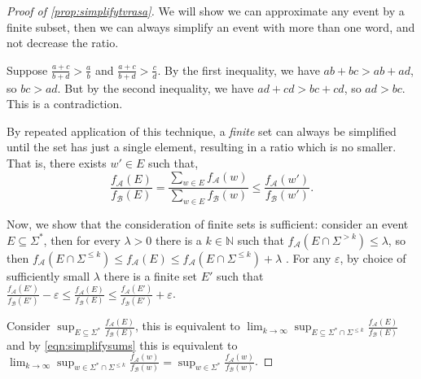 \documentclass[10pt,a4paper]{amsart}
\numberwithin{equation}{section}
\theoremstyle{plain}
\theoremstyle{definition}
\theoremstyle{remark}
\begin{document}
\begin{proof}[Proof of \cref{prop:simplifytvrasa}]
We will show we can approximate any event by a finite subset, then we can always simplify an event with more than one word, and not decrease the ratio.

Suppose $\frac{a+c}{b+d} > \frac{a}{b}$ and $\frac{a+c}{b+d} > \frac{c}{d}$.
By the first inequality, we have $ab + bc > ab + ad$, so $bc > ad$. But by the second inequality, we have $ad+cd > bc +cd$, so $ad > bc$. This is a contradiction.

By repeated application of this technique, a \emph{finite} set can always be simplified until the set has just a single element, resulting in a ratio which is no smaller.  That is, there exists $w'\in E$ such that,
\begin{equation}\label{eqn:simplifysums} \frac{f_{\mathcal A}(E) }{ f_{\mathcal B}(E)} =  \frac{\sum_{w\in E}f_{\mathcal A}(w)}{\sum_{w\in E}f_{\mathcal B}(w)} \le \frac{f_{\mathcal A}(w')}{f_{\mathcal B}(w')}.\end{equation}

Now, we show that the consideration of finite sets is sufficient: consider an event $E\subseteq\Sigma^*$, then for every $\lambda > 0 $ there is a $k\in\mathbb{N}$ such that $f_{\mathcal{A}}(E\cap \Sigma^{>k}) \le \lambda$, so then $f_{\mathcal{A}}(E\cap \Sigma^{\le k}) \le f_{\mathcal{A}}(E) \le f_{\mathcal{A}}(E\cap \Sigma^{\le k}) + \lambda$ \cite[Lemma 12]{kiefer2018computing}. For any $\varepsilon$, by choice of sufficiently small $\lambda$ there is a finite set $E'$ such that  $\frac{f_{\mathcal{A}}(E')}{f_{\mathcal{B}}(E')} - \varepsilon \le  \frac{f_{\mathcal{A}}(E)}{f_{\mathcal{B}}(E)} \le \frac{f_{\mathcal{A}}(E')}{f_{\mathcal{B}}(E')} +  \varepsilon$.

Consider $\sup_{E \subseteq \Sigma^*} \frac{f_{\mathcal{A}}(E)}{f_{\mathcal{B}}(E)} $, this is equivalent to $\lim_{k\to\infty}\sup_{E\subseteq \Sigma^* \cap \Sigma^{\le k}}\frac{f_{\mathcal{A}}(E)}{f_{\mathcal{B}}(E)} $ and by \cref{eqn:simplifysums} this is equivalent to $\lim_{k\to\infty}\sup_{w\in \Sigma^* \cap \Sigma^{\le k}}\frac{f_{\mathcal{A}}(w)}{f_{\mathcal{B}}(w)} =\sup_{w\in \Sigma^*}\frac{f_{\mathcal{A}}(w)}{f_{\mathcal{B}}(w)} $.\end{proof}
\end{document}
